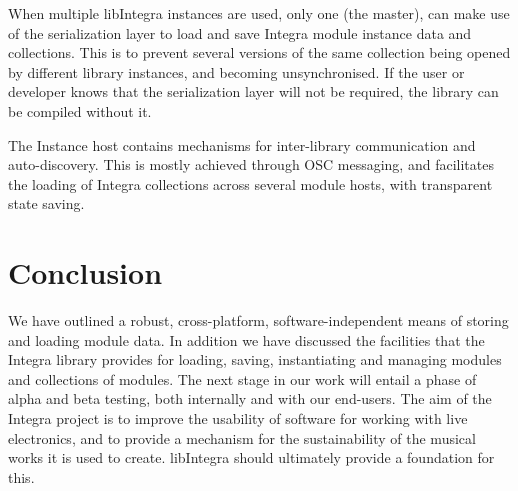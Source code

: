When multiple libIntegra instances are used, only one (the master), can make use of the serialization layer to load and save Integra module instance data and collections. This is to prevent several versions of the same collection being opened by different library instances, and becoming unsynchronised. If the user or developer knows that the serialization layer will not be required, the library can be compiled without it.

The Instance host contains mechanisms for inter-library communication and auto-discovery. This is mostly achieved through OSC messaging, and facilitates the loading of Integra collections across several module hosts, with transparent state saving.


\section{Conclusion}\label{sec:conclusion}

We have outlined a robust, cross-platform, software-in\-dependent means of storing and loading module data. In addition we have discussed the facilities that the Integra library provides for loading, saving, instantiating and managing modules and collections of modules. The next stage in our work will entail a phase of alpha and beta testing, both internally and with our end-users. The aim of the Integra project is to improve the usability of software for working with live electronics, and to provide a mechanism for the sustainability of the musical works it is used to create. libIntegra should ultimately provide a foundation for this.
